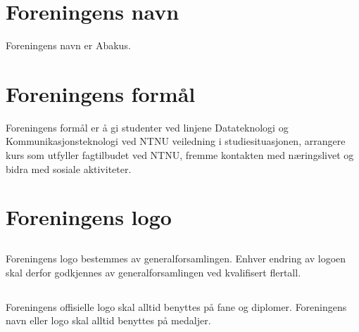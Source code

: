 \section{Foreningens navn}
Foreningens navn er Abakus.

\section{Foreningens formål}
Foreningens formål er å gi studenter ved linjene Datateknologi og
Kommunikasjonsteknologi ved NTNU veiledning i studiesituasjonen, arrangere
kurs som utfyller fagtilbudet ved NTNU, fremme kontakten med næringslivet og
bidra med sosiale aktiviteter.

\section{Foreningens logo}

\subsection{}
Foreningens logo bestemmes av generalforsamlingen. Enhver endring av logoen
skal derfor godkjennes av generalforsamlingen ved kvalifisert flertall.

\subsection{}
Foreningens offisielle logo skal alltid benyttes på fane og diplomer.
Foreningens navn eller logo skal alltid benyttes på medaljer. 

